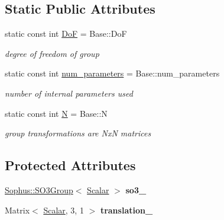 \subsection*{Static Public Attributes}
\begin{DoxyCompactItemize}
\item 
static const int \hyperlink{class_sophus_1_1_s_e3_group_a57fa2346b323fb65e4197b4b5740dbed}{DoF} = Base\+::\+DoF\hypertarget{class_sophus_1_1_s_e3_group_a57fa2346b323fb65e4197b4b5740dbed}{}\label{class_sophus_1_1_s_e3_group_a57fa2346b323fb65e4197b4b5740dbed}

\begin{DoxyCompactList}\small\item\em degree of freedom of group \end{DoxyCompactList}\item 
static const int \hyperlink{class_sophus_1_1_s_e3_group_ad16cb89b7103f0e38b2aa6d61a417eff}{num\+\_\+parameters} = Base\+::num\+\_\+parameters\hypertarget{class_sophus_1_1_s_e3_group_ad16cb89b7103f0e38b2aa6d61a417eff}{}\label{class_sophus_1_1_s_e3_group_ad16cb89b7103f0e38b2aa6d61a417eff}

\begin{DoxyCompactList}\small\item\em number of internal parameters used \end{DoxyCompactList}\item 
static const int \hyperlink{class_sophus_1_1_s_e3_group_a534097cb22269028a650e47ef1045041}{N} = Base\+::N\hypertarget{class_sophus_1_1_s_e3_group_a534097cb22269028a650e47ef1045041}{}\label{class_sophus_1_1_s_e3_group_a534097cb22269028a650e47ef1045041}

\begin{DoxyCompactList}\small\item\em group transformations are NxN matrices \end{DoxyCompactList}\end{DoxyCompactItemize}
\subsection*{Protected Attributes}
\begin{DoxyCompactItemize}
\item 
\hyperlink{class_sophus_1_1_s_o3_group}{Sophus\+::\+S\+O3\+Group}$<$ \hyperlink{class_sophus_1_1_s_e3_group_a8b19ef5ffe83465341b619047581219e}{Scalar} $>$ {\bfseries so3\+\_\+}\hypertarget{class_sophus_1_1_s_e3_group_aa976a598db1641b2a0edc43004096b69}{}\label{class_sophus_1_1_s_e3_group_aa976a598db1641b2a0edc43004096b69}

\item 
Matrix$<$ \hyperlink{class_sophus_1_1_s_e3_group_a8b19ef5ffe83465341b619047581219e}{Scalar}, 3, 1 $>$ {\bfseries translation\+\_\+}\hypertarget{class_sophus_1_1_s_e3_group_a0c439486ac1add8f98a28ec908a594b1}{}\label{class_sophus_1_1_s_e3_group_a0c439486ac1add8f98a28ec908a594b1}

\end{DoxyCompactItemize}
